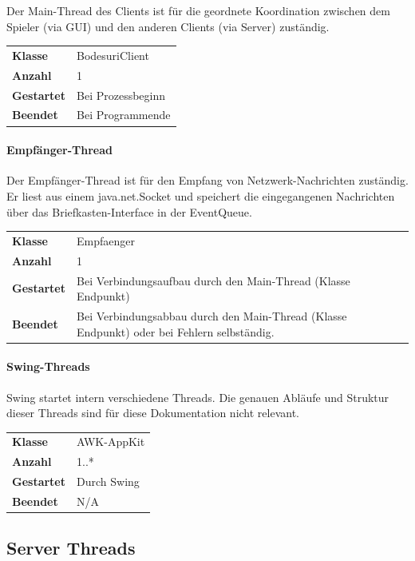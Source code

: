 \documentclass[12pt,halfparskip]{scrartcl}
\begin{document}
Der Main-Thread des Clients ist für die geordnete Koordination zwischen dem Spieler (via GUI) und den anderen Clients (via Server) zuständig.


\begin{tabular}{@{} l p{12.5cm}}
\textbf{Klasse}       & BodesuriClient \\
\textbf{Anzahl}       & 1 \\
\textbf{Gestartet}    & Bei Prozessbeginn \\
\textbf{Beendet}      & Bei Programmende
\end{tabular}

\paragraph{Empfänger-Thread}

Der Empfänger-Thread ist für den Empfang von Netzwerk-Nachrichten zuständig. Er liest aus einem java.net.Socket und speichert die eingegangenen Nachrichten über das Briefkasten-Interface in der EventQueue.

\begin{tabular}{@{} l p{12.5cm}}
\textbf{Klasse}       & Empfaenger \\
\textbf{Anzahl}       & 1 \\
\textbf{Gestartet}    & Bei Verbindungsaufbau durch den Main-Thread (Klasse Endpunkt) \\
\textbf{Beendet}      & Bei Verbindungsabbau durch den Main-Thread (Klasse Endpunkt) oder bei Fehlern selbständig.
\end{tabular}


\paragraph{Swing-Threads}
\label{ssub:swing_threads}

Swing startet intern verschiedene Threads. Die genauen Abläufe und Struktur dieser Threads sind für diese Dokumentation nicht relevant.

\begin{tabular}{@{} l p{12.5cm}}
\textbf{Klasse}       & AWK-AppKit \\
\textbf{Anzahl}       & 1..* \\
\textbf{Gestartet}    & Durch Swing \\
\textbf{Beendet}      & N/A


\end{tabular}

\clearpage
\subsection{Server Threads}
\label{ssub:server}
\end{document}
